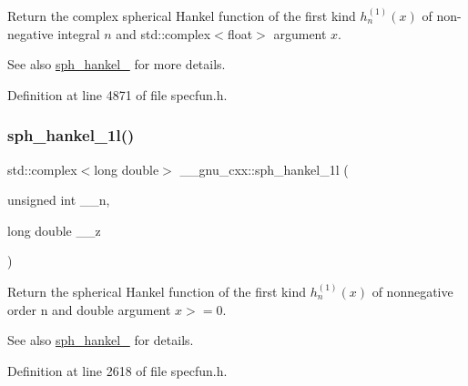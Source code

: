 Return the complex spherical Hankel function of the first kind $ h^{(1)}_n(x) $ of non-\/negative integral $ n $ and {\ttfamily std\+::complex$<$float$>$} argument $ x $.

\begin{DoxySeeAlso}{See also}
\hyperlink{group__gnu__math__spec__func_ga4424f565fb224ab88b177beb65d08305}{sph\+\_\+hankel\+\_} for more details. 
\end{DoxySeeAlso}


Definition at line 4871 of file specfun.\+h.

\mbox{\label{group__gnu__math__spec__func_ga6e77fd5cddfbd57d9120b20fc6c30e6f}} 
\subsubsection{\texorpdfstring{sph\+\_\+hankel\+\_\+1l()}{sph\_hankel\_1l()}\hspace{0.1cm}{\footnotesize\ttfamily [1/2]}}
{\footnotesize\ttfamily std\+::complex$<$long double$>$ \+\_\+\+\_\+gnu\+\_\+cxx\+::sph\+\_\+hankel\+\_\+1l (\begin{DoxyParamCaption}\item[{unsigned int}]{\+\_\+\+\_\+n,  }\item[{long double}]{\+\_\+\+\_\+z }\end{DoxyParamCaption})\hspace{0.3cm}{\ttfamily [inline]}}

Return the spherical Hankel function of the first kind $ h^{(1)}_n(x) $ of nonnegative order n and { double} argument $ x >= 0 $.

\begin{DoxySeeAlso}{See also}
\hyperlink{group__gnu__math__spec__func_ga4424f565fb224ab88b177beb65d08305}{sph\+\_\+hankel\+\_} for details. 
\end{DoxySeeAlso}


Definition at line 2618 of file specfun.\+h.

\mbox{\label{group__gnu__math__spec__func_ga3e9d889d8f2e4792e892b12b1f5948b9}} 
